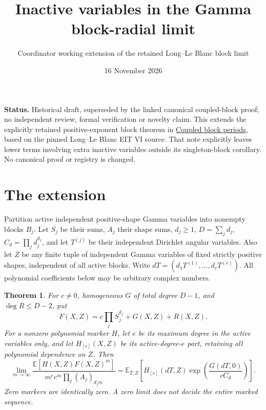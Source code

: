 \documentclass[11pt]{article}
\title{Inactive variables in the Gamma block-radial limit}
\author{Coordinator working extension of the retained Long--Le Blanc block limit}
\date{16 November 2026}
\newtheorem{theorem}{Theorem}
\newcommand{\E}{\mathbb E}
\begin{document}
\maketitle
\noindent\textbf{Status.}
Historical draft, superseded by the linked canonical coupled-block proof; no independent review, formal verification or
novelty claim. This extends the explicitly retained positive-exponent block
theorem in \href{../../../jacobian-followup/factorial-image-rigidity/COUPLED_BLOCK_PERIODS.tex}
{Coupled block periods}, based on the pinned Long--Le Blanc EIT VI source.
That note explicitly leaves lower terms involving extra inactive variables
outside its singleton-block corollary. No canonical proof or registry is changed.

\section{The extension}
Partition active independent positive-shape Gamma variables into nonempty
blocks $B_j$. Let $S_j$ be their sums, $A_j$ their shape sums,
$d_j\ge1$, $D=\sum_jd_j$, $C_d=\prod_jd_j^{d_j}$, and let $T^{(j)}$ be
their independent Dirichlet angular variables. Also let $Z$ be any finite
tuple of independent Gamma variables of fixed strictly positive shapes,
independent of all active blocks. Write $dT=(d_1T^{(1)},\ldots,d_rT^{(r)})$.
All polynomial coefficients below may be arbitrary complex numbers.

\begin{theorem}
For $c\ne0$, homogeneous $G$ of total degree $D-1$, and
$\deg R\le D-2$, put
\[
 F(X,Z)=c\prod_jS_j^{d_j}+G(X,Z)+R(X,Z).
\]
For a nonzero polynomial marker $H$, let $e$ be its maximum degree in
the active variables only, and let $H_{[e]}(X,Z)$ be its active-degree-$e$
part, retaining all polynomial dependence on $Z$. Then
\[
 \lim_{m\to\infty}
 \frac{\E[H(X,Z)F(X,Z)^m]}
 {m^e c^m\prod_j(A_j)_{d_jm}}
 =
 \E_{T,Z}\left[
 H_{[e]}(dT,Z)
 \exp\!\left(\frac{G(dT,0)}{cC_d}\right)\right].
 \tag{1}
\]
Zero markers are identically zero. A zero limit does not decide the
entire marked sequence.
\end{theorem}
\end{document}

